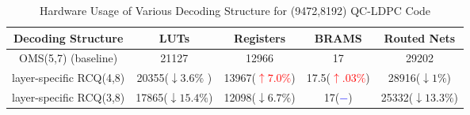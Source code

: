 \begin{table*}[t]
    \centering
    \caption{\label{tab: hardware_usage} Hardware Usage of Various Decoding Structure for (9472,8192) QC-LDPC Code }
    \begin{tabular}{|c|c|c|c|c|}
    \hline
    Decoding Structure & LUTs                       & Registers                  & BRAMS                        & Routed Nets                \\ \hline
    OMS(5,7) (baseline)          & 21127                      & 12966                     & 17                    & 29202                      \\ \hline
    layer-specific RCQ(4,8)           & 20355(\textcolor{mygreen}{$\downarrow 3.6\%$} ) & 13967(\textcolor{red}{$\uparrow 7.0\%$}) & 17.5(\textcolor{red}{$\uparrow .03\%$}) & 28916(\textcolor{mygreen}{$\downarrow 1\%$}) \\ \hline
    layer-specific RCQ(3,8)           & 17865(\textcolor{mygreen}{$\downarrow 15.4\%$}) & 12098(\textcolor{mygreen}{$\downarrow 6.7\%$}) & 17(\textcolor{blue}{$-$})                &  25332\textcolor{mygreen}{($\downarrow 13.3\%$}) \\ \hline
    \end{tabular}
    \end{table*}